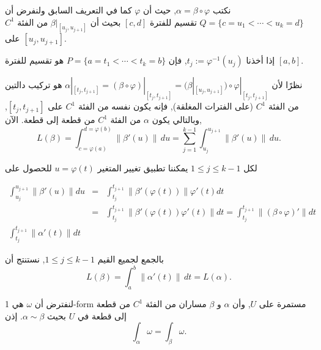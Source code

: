 \begin{demonstration}
نكتب \( \alpha = \beta \circ \varphi \), حيث أن \( \varphi \) كما في التعريف السابق ولنفرض أن \( Q = \{c = u_1 < \cdots < u_k = d\} \) تقسيم للفترة $[c, d]$ بحيث أن \( \beta|_{[u_j, u_{j+1}]} \) من الفئة \( C^1 \) على $[u_j, u_{j+1}]$.

إذا أخذنا \( t_j := \varphi^{-1}(u_j) \), فإن \( P = \{a = t_1 < \cdots < t_k = b\} \) هو تقسيم للفترة $[a, b]$.

نظرًا لأن \( \alpha|_{[t_j, t_{j+1}]} = (\beta \circ \varphi)|_{[t_j, t_{j+1}]} = (\beta|_{[u_j, u_{j+1}]}) \circ \varphi|_{[t_j, t_{j+1}]} \) هو تركيب دالتين من الفئة \( C^1 \) (على الفترات المغلقة), فإنه يكون نفسه من الفئة \( C^1 \) على $[t_j, t_{j+1}]$, وبالتالي يكون \( \alpha \) من الفئة \( C^1 \) من قطعة إلى قطعة. الآن,
\[ L(\beta) = \int_{c=\varphi(a)}^{d=\varphi(b)} \|\beta'(u)\| \, du = \sum_{j=1}^{k-1} \int_{u_j}^{u_{j+1}} \|\beta'(u)\| \, du. \]

لكل \( 1 \leq j \leq k - 1 \) يمكننا تطبيق تغيير المتغير \( u = \varphi(t) \) للحصول على

\begin{eqnarray*}
    \int_{u_j}^{u_{j+1}} \| \beta'(u) \| du &=&  \int_{t_j}^{t_{j+1}} \| \beta'(\varphi(t)) \|\varphi'(t) dt
    \\
    &=&  \int_{t_j}^{t_{j+1}} \| \beta'(\varphi(t)) \varphi'(t)\| dt = \int_{t_j}^{t_{j+1}} \| (\beta \circ \varphi)'\| dt
    \\
    \int_{t_j}^{t_{j+1}} \| \alpha'(t)\| dt
\end{eqnarray*}

بالجمع لجميع القيم \( 1 \leq j \leq k - 1 \), نستنتج أن
\[ 
L(\beta) = \int_a^b \|\alpha'(t)\| \, dt = L(\alpha). 
\]

\end{demonstration}

\begin{lemma}
لنفترض أن \( \omega \) هي 1-form مستمرة على \( U \), وأن \( \alpha \) و \( \beta \) مساران من الفئة \( C^1 \) من قطعة إلى قطعة في \( U \) بحيث \( \alpha \sim \beta \). إذن
\[ \int_\alpha \omega = \int_\beta \omega. \]
\end{lemma}

